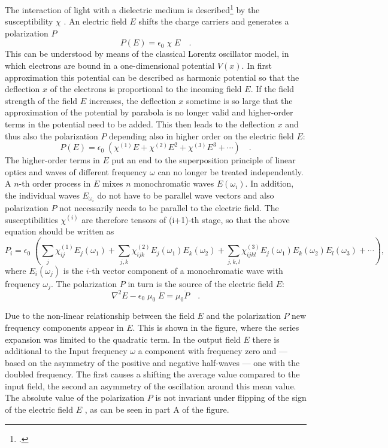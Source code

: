 The interaction of light with a dielectric medium is described\footcite{MilonniEberly1988,Yariv1989} by the  susceptibility $\chi$ .
An electric field $E$ shifts the
charge carriers and generates a polarization $P$
\begin{equation}
  P(E) = \epsilon_0 \; \chi \; E \quad.
\end{equation}
This can be understood by means of the classical Lorentz oscillator model,
in which electrons are bound  in a one-dimensional potential $V(x)$. In first approximation this potential can be described as
harmonic potential so that the deflection
$x$ of the electrons is proportional to the incoming field $E$.
If the field strength of the field $E$ increases, the deflection
$x$ sometime is so large that the approximation of the potential by
parabola is no longer valid and higher-order terms in the
potential need to be added. This then leads to the deflection
$x$ and thus also the polarization $P$ depending also in higher
order  on the electric field $E$:
\begin{equation}
  P(E) = \epsilon_0 \; \left( \chi^{(1)} E + \chi^{(2)} E^2 + \chi^{(3)}
  E^3 + \cdots \right)  \quad .
\end{equation}
The higher-order terms in $E$  put an end to the 
superposition principle of linear optics and 
 waves of different
frequency $\omega$ can no longer be treated independently.
A $n$-th order process in $E$ mixes $n$ monochromatic
waves $E(\omega_i)$. In addition, the individual waves
$E_{\omega_i}$ do not have to be parallel wave vectors and also
polarization $P$ not necessarily needs to be parallel to the electric field. The susceptibilities $\chi^{(i)}$ are therefore tensors of
(i+1)-th stage, so that the above equation
 should be written as
\begin{equation}
  P_i = \epsilon_0 \; \left( \sum_j \chi^{(1)}_{ij} E_j(\omega_1)
     + \sum_{j,k} \chi^{(2)}_{ijk} E_j(\omega_1) E_k(\omega_2) +
    \sum_{j,k,l} \chi^{(3)}_{ijkl} E_j(\omega_1) E_k(\omega_2) E_l(\omega_3) + \cdots \right)  ,
\end{equation}
where $E_i(\omega_j)$ is the $i$-th vector component of a
monochromatic wave with frequency $\omega_j$. The
polarization $P$ in turn is the source of the electric field $E$:
\begin{equation}
   \nabla^2 E - \epsilon_0 \; \mu_0 \; \ddot{E} = \mu_0 \ddot{P}  \quad .
   \label{eq_shg_wave equation}
\end{equation}

Due to the non-linear relationship between the field $E$ and the
polarization $P$ new frequency components appear in $E$. This
is shown in the figure,
where the series expansion was limited to the quadratic term. In the output field $E$ there is  additional to the 
Input frequency $\omega$ a component with frequency zero and --- based on the asymmetry of the positive and negative half-waves ---
one with the doubled frequency. The first causes a
shifting the average value compared to the input field, the second
an asymmetry of the oscillation around this mean value. The absolute value of the polarization $P$ is not invariant under flipping of the  sign of the electric field $E$ , as can be seen in part A of the figure.


